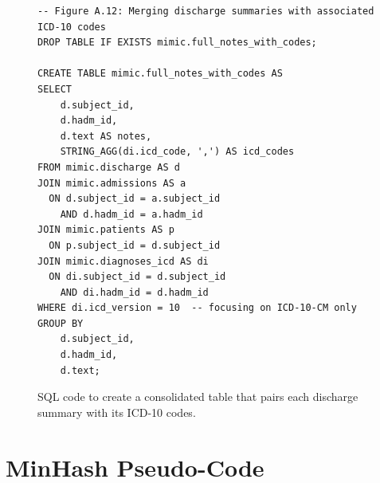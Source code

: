 
\begin{figure}[H]
\centering
\begin{minipage}{\textwidth}
\begin{verbatim}
-- Figure A.12: Merging discharge summaries with associated ICD-10 codes
DROP TABLE IF EXISTS mimic.full_notes_with_codes;

CREATE TABLE mimic.full_notes_with_codes AS
SELECT
    d.subject_id,
    d.hadm_id,
    d.text AS notes,
    STRING_AGG(di.icd_code, ',') AS icd_codes
FROM mimic.discharge AS d
JOIN mimic.admissions AS a
  ON d.subject_id = a.subject_id
    AND d.hadm_id = a.hadm_id
JOIN mimic.patients AS p
  ON p.subject_id = d.subject_id
JOIN mimic.diagnoses_icd AS di
  ON di.subject_id = d.subject_id
    AND di.hadm_id = d.hadm_id
WHERE di.icd_version = 10  -- focusing on ICD-10-CM only
GROUP BY
    d.subject_id,
    d.hadm_id,
    d.text;
\end{verbatim}
\end{minipage}
\caption{SQL code to create a consolidated table that pairs each discharge summary with its ICD-10 codes.}
\label{fig:sql12_merge_notes_codes}
\end{figure}

\chapter{MinHash Pseudo-Code}
\label{app:minhash}

